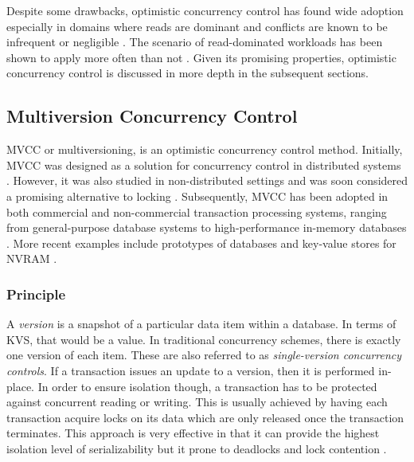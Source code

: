 Despite some drawbacks, optimistic concurrency control has found wide adoption
especially in domains where reads are dominant and conflicts are known to be
infrequent or negligible \cite{carey1986performance, larson2011high,
wu2017empirical}. The scenario of read-dominated workloads has been shown to
apply more often than not \cite{krueger2011fast, andrei2017sap}. Given its
promising properties, optimistic concurrency control is discussed in more depth
in the subsequent sections.

\subsection{Multiversion Concurrency Control}

MVCC or multiversioning, is an optimistic concurrency control method. Initially,
MVCC was designed as a solution for concurrency control in distributed systems
\cite{reed1978naming}. However, it was also studied in non-distributed settings
and was soon considered a promising alternative to locking
\cite{kung1981optimistic, bernstein1983multiversion, carey1983multiple,
hadzilacos1986algorithmic, carey1986performance}. Subsequently, MVCC has been
adopted in both commercial and non-commercial transaction processing systems,
ranging from general-purpose database systems to high-performance in-memory
databases \cite{larson2011high, lee2013high, diaconu2013hekaton,
schwalb2015efficient}. More recent examples include prototypes of databases and
key-value stores for NVRAM \cite{bailey2013exploring, oukid2014sofort,
schwalb2016hyrise}.

\subsubsection{Principle}

A \emph{version} is a snapshot of a particular data item within a database. In
terms of KVS, that would be a value. In traditional concurrency schemes, there
is exactly one version of each item. These are also referred to as
\emph{single-version concurrency controls}. If a transaction issues an update to
a version, then it is performed in-place. In order to ensure isolation though, a
transaction has to be protected against concurrent reading or writing. This is
usually achieved by having each transaction acquire locks on its data which are
only released once the transaction terminates. This approach is very effective
in that it can provide the highest isolation level of serializability but it
prone to deadlocks and lock contention \cite{berenson1995critique}.

